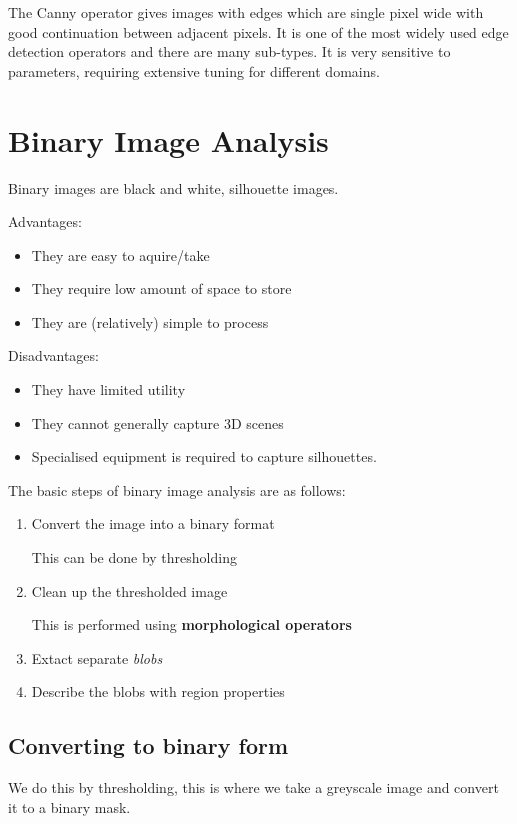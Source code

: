\documentclass{article}
\begin{document}
The Canny operator gives images with edges which are single pixel wide with good continuation between adjacent pixels. It is one of the most widely used edge detection operators and there are many sub-types. It is very sensitive to parameters, requiring extensive tuning for different domains.

\section{Binary Image Analysis}
Binary images are black and white, silhouette images.

Advantages:
\begin{itemize}
  \item They are easy to aquire/take
  \item They require low amount of space to store
  \item They are (relatively) simple to process
\end{itemize}

Disadvantages:
\begin{itemize}
  \item  They have limited utility
  \item They cannot generally capture 3D scenes
  \item Specialised equipment is required to capture silhouettes.
\end{itemize}

The basic steps of binary image analysis are as follows:

\begin{enumerate}
  \item Convert the image into a binary format\

        This can be done by thresholding
  \item Clean up the thresholded image

        This is performed using \textbf{morphological operators}
  \item Extact separate \textit{blobs}
  \item Describe the blobs with region properties
\end{enumerate}

\subsection{Converting to binary form}

We do this by thresholding, this is where we take a greyscale image and convert it to a binary mask.
\end{document}
